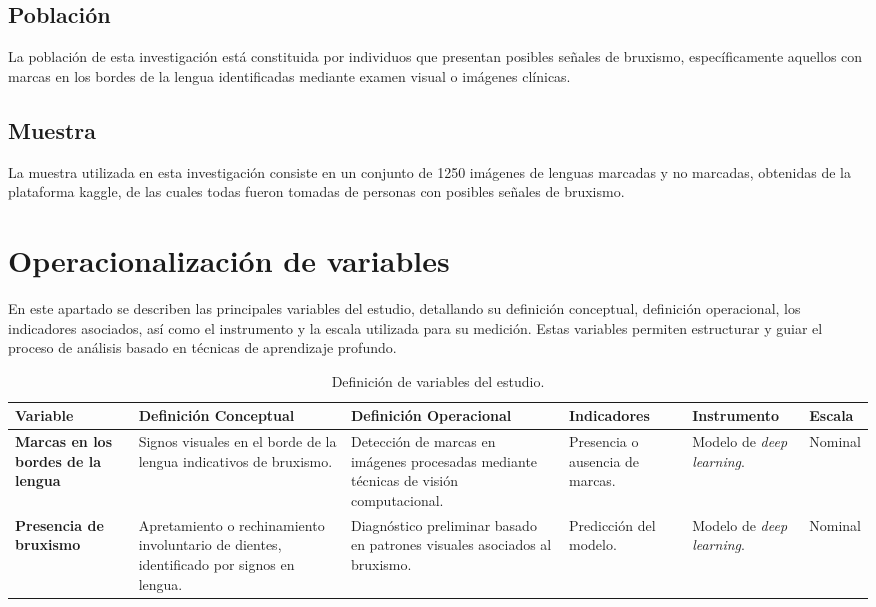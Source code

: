 \subsection{Población}
La población de esta investigación está constituida por individuos que presentan posibles señales de bruxismo, específicamente aquellos con marcas en los bordes de la lengua identificadas mediante examen visual o imágenes clínicas.

\subsection{Muestra}
La muestra utilizada en esta investigación consiste en un conjunto de 1250 imágenes de lenguas marcadas y no marcadas, obtenidas de la plataforma kaggle, de las cuales todas fueron tomadas de personas con posibles señales de bruxismo.

\section{Operacionalización de variables}
En este apartado se describen las principales variables del estudio, detallando su definición conceptual, definición operacional, los indicadores asociados, así como el instrumento y la escala utilizada para su medición. Estas variables permiten estructurar y guiar el proceso de análisis basado en técnicas de aprendizaje profundo.

\begin{table}[H]
\centering
\caption{Definición de variables del estudio.}
\label{tabla:variables}
\begin{tabular}{|p{2.5cm}|p{3cm}|p{3.5cm}|p{2.5cm}|p{2.5cm}|p{1.5cm}|}
\hline
\textbf{Variable} & \textbf{Definición Conceptual} & \textbf{Definición Operacional} & \textbf{Indicadores} & \textbf{Instrumento} & \textbf{Escala} \\ \hline
\textbf{Marcas en los bordes de la lengua} & Signos visuales en el borde de la lengua indicativos de bruxismo. & Detección de marcas en imágenes procesadas mediante técnicas de visión computacional. & Presencia o ausencia de marcas. & Modelo de \textit{deep learning}. & Nominal \\ \hline
\textbf{Presencia de bruxismo} & Apretamiento o rechinamiento involuntario de dientes, identificado por signos en lengua. & Diagnóstico preliminar basado en patrones visuales asociados al bruxismo. & Predicción del modelo. & Modelo de \textit{deep learning}. & Nominal \\ \hline
\end{tabular}
\end{table}

